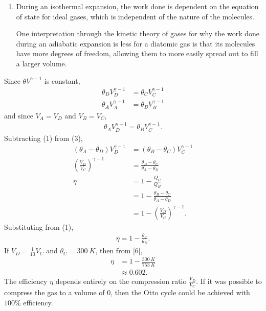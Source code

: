 \documentclass[a4paper,12pt]{article}
\begin{document}
\begin{enumerate}[label=\textbf{[\arabic*]}]
\begin{enumerate}
            \item
                During an isothermal expansion, the work done is dependent on the equation of state for ideal gases, which is independent of the nature of the molecules. \par
                One interpretation through the kinetic theory of gases for why the work done during an adiabatic expansion is less for a diatomic gas is that its molecules have more degrees of freedom, allowing them to more easily spread out to fill a larger volume.

        \end{enumerate}

    \item
        Since $\theta V^{\gamma - 1}$ is constant,
        \begin{align}
            \theta_D V_D^{\gamma - 1} &= \theta_C V_C^{\gamma - 1} \\
            \theta_A V_A^{\gamma - 1} &= \theta_B V_B^{\gamma - 1}
        \end{align}
        and since $V_A = V_D$ and $V_B = V_C$,
        \begin{align}
            \theta_A V_D^{\gamma - 1} = \theta_B V_C^{\gamma - 1}.
        \end{align}
        Subtracting (1) from (3),
        \begin{align*}
            (\theta_A - \theta_D) V_D^{\gamma - 1} &= (\theta_B - \theta_C) V_C^{\gamma - 1} \\
            \left( \frac{V_D}{V_C} \right)^{\gamma - 1} &= \frac{\theta_B - \theta_C}{\theta_A - \theta_D} \\
            \eta &= 1 - \frac{Q_C}{Q_H} \\
            &= 1 - \frac{\theta_B - \theta_C}{\theta_A - \theta_D} \\
            &= 1 - \left( \frac{V_D}{V_C} \right)^{\gamma - 1}.
        \end{align*}
        Substituting from (1),
        \begin{align*}
            \eta = 1 - \frac{\theta_C}{\theta_D}.
        \end{align*}
        If $V_D = \frac{1}{10} V_C$ and $\theta_C = \SI{300}{K}$, then from [6],
        \begin{align*}
            \eta &= 1 - \frac{\SI{300}{K}}{\SI{753}{K}} \\
            &\approx 0.602.
        \end{align*}
        The efficiency $\eta$ depends entirely on the compression ratio $\frac{V_D}{V_C}$. If it was possible to compress the gas to a volume of 0, then the Otto cycle could be achieved with $100\%$ efficiency.

\end{enumerate}
\end{document}
